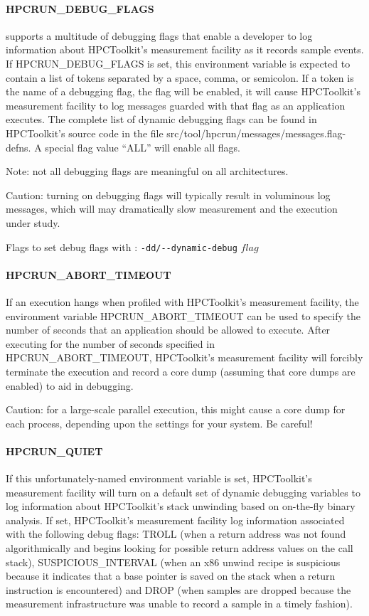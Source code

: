 \paragraph{HPCRUN\_DEBUG\_FLAGS}

\HPCToolkit{} supports a multitude of debugging flags that enable a
developer to log information about HPCToolkit's measurement facility
as it records sample events. If HPCRUN\_DEBUG\_FLAGS is set, this
environment variable is expected to contain a list of tokens separated
by a space, comma, or semicolon. If a token is the name of a debugging
flag, the flag will be enabled, it will cause HPCToolkit's measurement
facility to log messages guarded with that flag as an application
executes. The complete list of dynamic debugging flags can be found
in HPCToolkit's source code in the file
src/tool/hpcrun/messages/messages.flag-defns. A special flag value
“ALL” will enable all flags. 

\parg
Note: not all debugging flags are
meaningful on all architectures. 

\parg 
Caution: turning on debugging flags
will typically result in voluminous log messages, which will may
dramatically slow measurement and the execution under study.

\parg
Flags to set debug flags with \hpcrun: \verb|-dd/--dynamic-debug| $flag$

\paragraph{HPCRUN\_ABORT\_TIMEOUT}

If an execution hangs when profiled with HPCToolkit's measurement
facility, the environment variable HPCRUN\_ABORT\_TIMEOUT can be
used to specify the number of seconds that an application should
be allowed to execute. After executing for the number of seconds
specified in HPCRUN\_ABORT\_TIMEOUT, HPCToolkit's measurement
facility will forcibly terminate the execution and record a core
dump (assuming that core dumps are enabled) to aid in debugging.

\parg
Caution: for a large-scale parallel execution, this might cause a
core dump for each process, depending upon the settings for your
system. Be careful!

\paragraph{HPCRUN\_QUIET}

If this unfortunately-named environment variable is set, HPCToolkit's
measurement facility will turn on a default set of dynamic debugging
variables to log information about HPCToolkit's stack unwinding
based on on-the-fly binary analysis. If set, HPCToolkit's measurement
facility log information associated with the following debug flags:
TROLL (when a return address was not found algorithmically
and \HPCToolkit{} begins looking for possible return address values
on the call stack), SUSPICIOUS\_INTERVAL (when an x86 unwind recipe
is suspicious because it indicates that a base pointer is saved on
the stack when a return instruction is encountered) and DROP (when
samples are dropped because the measurement infrastructure was
unable to record a sample in a timely fashion).

